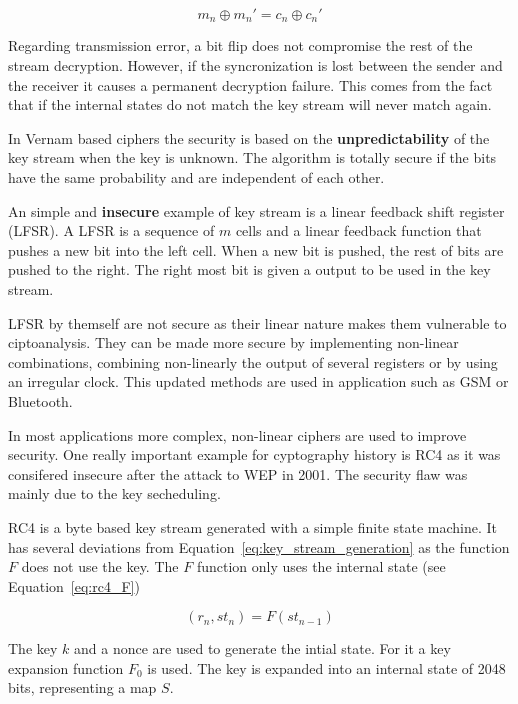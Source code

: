 \begin{equation}
m_n \oplus m_n' = c_n \oplus c_n'
\label{eq:nonce_repetition_keystream}
\end{equation}

Regarding transmission error, a bit flip does not compromise the rest of the stream decryption.
However, if the syncronization is lost between the sender and the receiver it causes a permanent decryption failure.
This comes from the fact that if the internal states do not match the key stream will never match again.

In Vernam based ciphers the security is based on the \textbf{unpredictability} of the key stream when the key is unknown.
The algorithm is totally secure if the bits have the same probability and are independent of each other.

An simple and \textbf{insecure} example of key stream is a linear feedback shift register (LFSR).
A LFSR is a sequence of $m$ cells and a linear feedback function that pushes a new bit into the left cell.
When a new bit is pushed, the rest of bits are pushed to the right.
The right most bit is given a output to be used in the key stream.

LFSR by themself are not secure as their linear nature makes them vulnerable to ciptoanalysis.
They can be made more secure by implementing non-linear combinations, combining non-linearly the output of several registers or by using an irregular clock.
This updated methods are used in application such as GSM or Bluetooth.

In most applications more complex, non-linear ciphers are used to improve security.
One really important example for cyptography history is RC4 as it was consifered insecure after the attack to WEP in 2001.
The security flaw was mainly due to the key secheduling.

RC4 is a byte based key stream generated with a simple finite state machine.
It has several deviations from Equation~\ref{eq:key_stream_generation} as the function $F$ does not use the key.
The $F$ function only uses the internal state (see Equation~\ref{eq:rc4_F})

\begin{equation}
(r_n, st_n) = F(st_{n-1})
\label{eq:rc4_F}
\end{equation}

The key $k$ and a nonce are used to generate the intial state.
For it a key expansion function $F_0$ is used.
The key is expanded into an internal state of 2048 bits, representing a map $S$.

